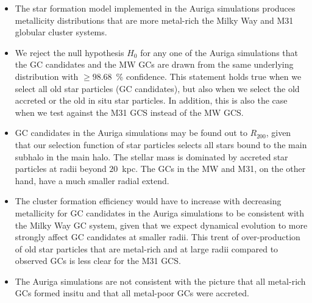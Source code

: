 \documentclass[a4paper,fleqn,usenatbib]{mnras}
\begin{document}
\begin{itemize}
    \item The star formation model implemented in the Auriga simulations produces
    metallicity distributions that are more metal-rich the Milky Way and M31
    globular cluster systems.

    \item We reject the null hypothesis $H_0$ for any one of the Auriga simulations 
    that the GC candidates and the MW GCs are drawn from the same underlying 
    distribution with $\geq 98.68$~\% confidence. This statement holds true when
    we select all old star particles (GC candidates), but also when we select the 
    old accreted or the old in situ star particles. In addition, this is also
    the case when we test against the M31 GCS instead of the MW GCS.

    \item GC candidates in the Auriga simulations may be found out to $R_{200}$,
    given that our selection function of star particles selects all stars bound
    to the main subhalo in the main halo. The stellar mass is dominated by accreted 
    star particles at radii beyond $20$~kpc. The GCs in the MW and M31, on the 
    other hand, have a much smaller radial extend.

    \item The cluster formation efficiency would have to increase with decreasing
    metallicity for GC candidates in the Auriga simulations to be consistent
    with the Milky Way GC system, given that we expect dynamical evolution to 
    more strongly affect GC candidates at smaller radii. This trent of over-production
    of old star particles that are metal-rich and at large radii compared to 
    observed GCs is less clear for the M31 GCS.

    \item The Auriga simulations are not consistent with the picture that all
    metal-rich GCs formed insitu and that all metal-poor GCs were accreted.

\end{itemize}
\end{document}
